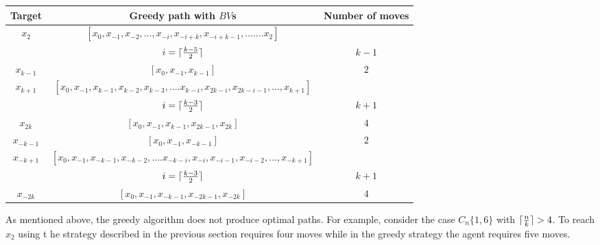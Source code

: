 \begin{center}
  \begin{tabular}{|c|c|c|}
 \hline
 Target & Greedy path with $BV$s & Number of moves 
\\
 \hline
$x_2$ &$[x_0, x_{-1}, x_{-2},\ldots, x_{-i},x_{-i+k}, x_{-i+k-1},\ldots.... x_2]$ &\\
&$i =  \lceil{{ k-5} \over 2}\rceil$ & $k-1$ \\
\hline
 $x_{k-1}$ & $[x_0, x_{-1}, x_{k-1}]$ & $2$ \\

 \hline
 $x_{k+1}$ &  $[x_0, x_{-1}, x_{k-1}, x_{k-2}, x_{k-3},.... x_{k-i}, x_{2k-i}, x_{2k-i-1}, \ldots, x_{k+1}]$ &\\
    &  $i = \lceil{{ k-3} \over 2}\rceil$  & $k+1$ \\
 
 \hline
 $x_{2k}$ & $[x_0, x_{-1}, x_{k-1}, x_{2k-1},x_{2k}]$ & $4$ \\ %
              

\hline

$x_{-k-1}$ &$[x_0, x_{-1}, x_{-k-1}]$ & $2$ \\

\hline
 $x_{-k+1}$ & $[x_0, x_{-1}, x_{-k-1}, x_{-k-2},.... x_{-k-i}, x_{-i}, x_{-i-1}, x_{-i-2}, \ldots, x_{-k+1}]$ &\\
  &  $i = \lceil{{ k-3} \over 2}\rceil$ & $k+1$ \\
 \hline
 $x_{-2k}$ &  $[x_0, x_{-1}, x_{-k-1}, x_{-2k-1},x_{-2k}]$ & $4$ \\

 

\hline
\end{tabular} 

 \end{center}

As mentioned above, the greedy algorithm does not produce  optimal paths.
For example, consider the case   $C_n\{1,6\}$  with  $ \lceil{n \over k}\rceil>4$.
To reach   $x_{2}$ using t he   strategy  described in the previous section
 requires four moves while in the greedy strategy the agent  requires five moves.

